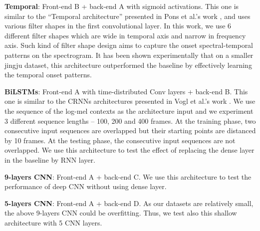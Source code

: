 \noindent\textbf{Temporal}: Front-end B + back-end A with sigmoid activations. This one is similar to the ``Temporal architecture'' presented in Pons et al.'s work \cite{Pons2017}, and uses various filter shapes in the first convolutional layer. In this work, we use 6 different filter shapes which are wide in temporal axis and narrow in frequency axis. Such kind of filter shape design aims to capture the onset spectral-temporal patterns on the spectrogram. It has been shown experimentally that on a smaller jingju dataset, this architecture outperformed the baseline by effectively learning the temporal onset patterns.

\noindent\textbf{BiLSTMs}: Front-end A with time-distributed \gls{Conv} layers + back-end B. This one is similar to the \gls{CRNN}s architectures presented in Vogl et al.'s work \cite{Vogl2017DrumTV}. We use the sequence of the log-mel contexts as the architecture input and we experiment 3 different sequence lengths -- 100, 200 and 400 frames. At the training phase, two consecutive input sequences are overlapped but their starting points are distanced by 10 frames. At the testing phase, the consecutive input sequences are not overlapped. We use this architecture to test the effect of replacing the dense layer in the baseline by \gls{RNN} layer.

\noindent\textbf{9-layers \gls{CNN}}: Front-end A + back-end C. We use this architecture to test the performance of deep \gls{CNN} without using dense layer.

\noindent\textbf{5-layers \gls{CNN}}: Front-end A + back-end D. As our datasets are relatively small, the above 9-layers \gls{CNN} could be overfitting. Thus, we test also this shallow architecture with 5 \gls{CNN} layers.

\begin{table}[ht!]
\centering
\caption{Total numbers of trainable parameters (TNoTP) of each architecture.}
\label{table:parameters}
\end{table}

